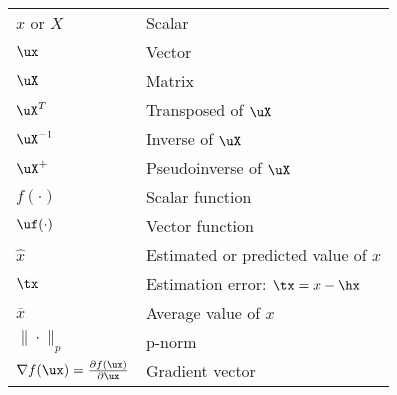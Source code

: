 \begin{longtable}[l]{ll}
$x$ or $X$ 				& Scalar\\
$\ux$ 						& Vector \\
$\uX$ 						& Matrix\\
$\uX^{T}$ 				& Transposed of $\uX$\\
$\uX^{-1}$ 				& Inverse of $\uX$\\
$\uX^{+}$ 				& Pseudoinverse of $\uX$\\
$f(\cdot)$ 				& Scalar function \\
$\uf(\cdot)$ 			& Vector function \\
$\hat x$ 					& Estimated or predicted value of $x$ \\
$\tx$ 						& Estimation error: $\tx=x-\hx$ \\
$\overline x$			& Average value of $x$\\
$\|\cdot \|_p$ 		& p-norm \\
$\nabla f(\ux)=\frac{\partial f(\ux)}{\partial \ux}$ & Gradient vector \\
\end{longtable}



%
%
\vspace{0.5cm}
